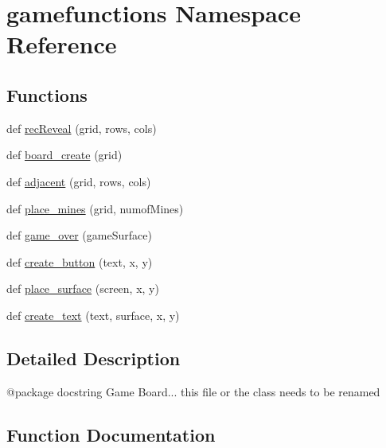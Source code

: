 \hypertarget{namespacegamefunctions}{}\section{gamefunctions Namespace Reference}
\label{namespacegamefunctions}
\subsection*{Functions}
\begin{DoxyCompactItemize}
\item 
def \mbox{\hyperlink{namespacegamefunctions_a7d344c04c49594d58ba15b6673f9f8d9}{rec\+Reveal}} (grid, rows, cols)
\item 
def \mbox{\hyperlink{namespacegamefunctions_a26a89961ef41d92fb61c4703f9c63dca}{board\+\_\+create}} (grid)
\item 
def \mbox{\hyperlink{namespacegamefunctions_a0a55e81352e3e0790627bb267c2391ae}{adjacent}} (grid, rows, cols)
\item 
def \mbox{\hyperlink{namespacegamefunctions_acf46cabff90f0d1e06c4aadc3865292a}{place\+\_\+mines}} (grid, numof\+Mines)
\item 
def \mbox{\hyperlink{namespacegamefunctions_a08a81f3d3aebb362a637fa900ca9af5c}{game\+\_\+over}} (game\+Surface)
\item 
def \mbox{\hyperlink{namespacegamefunctions_a60920b30a54df9dfed7de61f17403e07}{create\+\_\+button}} (text, x, y)
\item 
def \mbox{\hyperlink{namespacegamefunctions_a109b9daf1366f60cec625c3ff29fd7dd}{place\+\_\+surface}} (screen, x, y)
\item 
def \mbox{\hyperlink{namespacegamefunctions_aad080841b3df3284089074d16588ed82}{create\+\_\+text}} (text, surface, x, y)
\end{DoxyCompactItemize}


\subsection{Detailed Description}
\begin{DoxyVerb}@package docstring
   Game Board... this file or the class needs to be renamed
\end{DoxyVerb}
 

\subsection{Function Documentation}
\mbox{\label{namespacegamefunctions_a0a55e81352e3e0790627bb267c2391ae}} 
